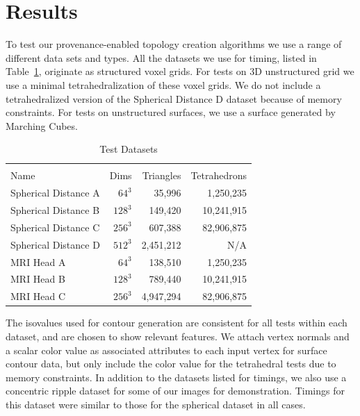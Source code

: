\documentclass[10pt,journal,cspaper,compsoc]{IEEEtran}
\begin{document}



\section{Results}

To test our provenance-enabled topology creation algorithms we use a range
of different data sets and types.  All the datasets we use for timing,
listed in Table~\ref{tab:datasets}, originate as structured voxel grids.
For tests on 3D unstructured grid we use a minimal tetrahedralization of
these voxel grids.  We do not include a tetrahedralized version of the
Spherical Distance D dataset because of memory constraints.  For tests on
unstructured surfaces, we use a surface generated by Marching Cubes.

\begin{table}[htb]
\begin{center}
\caption{Test Datasets}
\label{tab:datasets}
\begin{tabular}{l r r r}
\multicolumn{4}{c}{ } \\
Name & Dims &  Triangles & Tetrahedrons \\
\hline
Spherical Distance A & $64^3 $ & 35,996    & 1,250,235 \\
Spherical Distance B & $128^3$ & 149,420   & 10,241,915 \\
Spherical Distance C & $256^3$ & 607,388   & 82,906,875 \\
Spherical Distance D & $512^3$ & 2,451,212 & N/A \\
MRI Head A           & $64^3 $ & 138,510   & 1,250,235 \\
MRI Head B           & $128^3$ & 789,440   & 10,241,915 \\
MRI Head C           & $256^3$ & 4,947,294 & 82,906,875  \\
\end{tabular}
\end{center}
\end{table}

The isovalues used for contour generation are consistent for all tests within each dataset, and are chosen to show relevant features. We attach vertex normals and a scalar color value as associated attributes to each input vertex for surface contour data, but only include the color value for the tetrahedral tests due to memory constraints. In addition to the datasets listed for timings, we also use a concentric ripple dataset for some of our images for demonstration. Timings for this dataset were similar to those for the spherical dataset in all cases.
\end{document}

